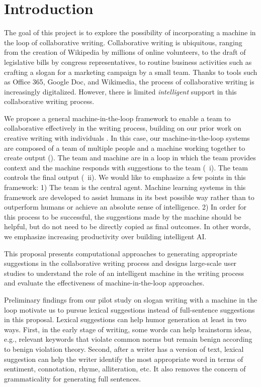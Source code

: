 
\section{Introduction}

The goal of this project is to explore the possibility of incorporating a machine in the loop of collaborative writing.
Collaborative writing is ubiquitous, ranging from the creation of Wikipedia by millions of online volunteers, to the draft of legislative bills by congress representatives, to routine business activities such as crafting a slogan for a marketing campaign by a small team.
Thanks to tools such as Office 365, Google Doc, and Wikimedia, the process of collaborative writing is increasingly digitalized.
However, there is limited {\em intelligent} support in this collaborative writing process.

We propose a general machine-in-the-loop framework to enable a team to collaborative effectively in the writing process, building on our prior work on creative writing with individuals \citep{clark+etal18}.
In this case, our machine-in-the-loop systems are composed of a team of multiple people and a machine working together to create output (). The team and machine are in a loop in which the team provides context and the machine responds with suggestions to the team (~i). The team controls the final output (~ii).
We would like to emphasize a few points in this framework:
1)  The team is the central agent. Machine learning systems in this framework are developed to assist humans in its best possible way rather than to outperform humans or achieve an absolute sense of intelligence.
2)  In order for this process to be successful, the suggestions made by the machine should be helpful, but do not need to be directly copied as final outcomes.
In other words, we emphasize increasing productivity over building intelligent AI.




This proposal presents computational approaches to generating appropriate suggestions in the collaborative writing process and designs large-scale user studies to understand the role of an intelligent machine in the writing process and evaluate the effectiveness of machine-in-the-loop approaches.

Preliminary findings from our pilot study on slogan writing with a machine in the loop motivate us to pursue lexical suggestions instead of full-sentence suggestions in this proposal.
Lexical suggestions can help humor generation at least in two ways.
First, in the early stage of writing, some words can help brainstorm ideas, e.g., relevant keywords that violate common norms but remain benign according to benign violation theory.
Second, after a writer has a version of text, lexical suggestion can help the writer identify the most appropriate word in terms of sentiment, connotation, rhyme, alliteration, etc.
It also removes the concern of grammaticality for generating full sentences.

